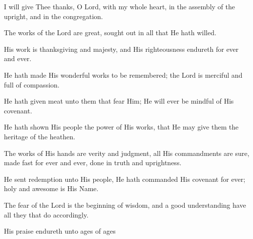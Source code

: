 I will give Thee thanks, O Lord, with my whole heart, in the assembly of the upright, and in the congregation.

The works of the Lord are great, sought out in all that He hath willed.

His work is thanksgiving and majesty, and His righteousness endureth for ever and ever.

He hath made His wonderful works to be remembered; the Lord is merciful and full of compassion.

He hath given meat unto them that fear Him; He will ever be mindful of His covenant.

He hath shown His people the power of His works, that He may give them the heritage of the heathen.

The works of His hands are verity and judgment, all His commandments are sure, made fast for ever and ever, done in truth and uprightness.

He sent redemption unto His people, He hath commanded His covenant for ever; holy and awesome is His Name.

The fear of the Lord is the beginning of wisdom, and a good understanding have all they that do accordingly.

His praise endureth unto ages of ages
